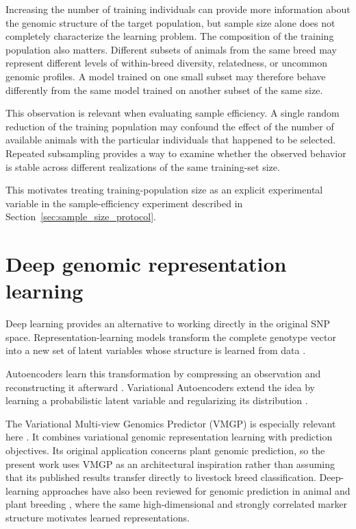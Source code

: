 Increasing the number of training individuals can provide more
information about the genomic structure of the target population, but
sample size alone does not completely characterize the learning
problem. The composition of the training population also matters.
Different subsets of animals from the same breed may represent
different levels of within-breed diversity, relatedness, or uncommon
genomic profiles. A model trained on one small subset may therefore
behave differently from the same model trained on another subset of
the same size.

This observation is relevant when evaluating sample efficiency.
A single random reduction of the training population may confound the
effect of the number of available animals with the particular
individuals that happened to be selected. Repeated subsampling provides
a way to examine whether the observed behavior is stable across
different realizations of the same training-set size.

This motivates treating training-population size as an explicit
experimental variable in the sample-efficiency experiment described in
Section~\ref{sec:sample_size_protocol}.


\section{Deep genomic representation learning}
\label{sec:deep_learning_fundamentals}

Deep learning provides an alternative to working directly in the
original SNP space. Representation-learning models transform the
complete genotype vector into a new set of latent variables whose
structure is learned from data \cite{bengio2013representation}.

Autoencoders learn this transformation by compressing an observation
and reconstructing it afterward
\cite{rumelhart1986learning, hinton2006reducing}. Variational
Autoencoders extend the idea by learning a probabilistic latent
variable and regularizing its distribution
\cite{kingma2013auto, rezende2014stochastic}.

The Variational Multi-view Genomics Predictor (VMGP) is especially
relevant here \cite{zhao2025vmgp}. It combines variational
genomic representation learning with prediction objectives. Its
original application concerns plant genomic prediction, so the
present work uses VMGP as an architectural inspiration rather than
assuming that its published results transfer directly to livestock
breed classification. Deep-learning approaches have also been reviewed
for genomic prediction in animal and plant breeding
\cite{montesinoslopez2021deep}, where the same high-dimensional and
strongly correlated marker structure motivates learned representations.

